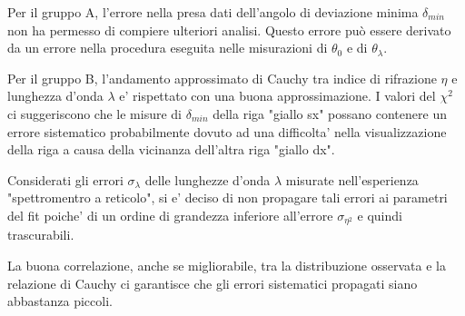 Per il gruppo A, l'errore nella presa dati dell'angolo di deviazione minima $\delta_{min}$ non ha permesso di compiere ulteriori analisi.
Questo errore può essere derivato da un errore nella procedura eseguita nelle misurazioni di $\theta_0$ e di $\theta_{\lambda}$.

Per il gruppo B, l'andamento approssimato di Cauchy tra indice di rifrazione $\eta$ e lunghezza d'onda $\lambda$ e' rispettato con una buona approssimazione.
I valori del $\chi^2$ ci suggeriscono che le misure di $\delta_{min}$ della riga "giallo sx" possano contenere un errore sistematico probabilmente dovuto ad una difficolta' nella visualizzazione della riga a causa della vicinanza dell'altra riga "giallo dx".

Considerati gli errori $\sigma_{\lambda}$ delle lunghezze d'onda $\lambda$ misurate nell'esperienza "spettromentro a reticolo", si e' deciso di non propagare tali errori ai parametri del fit poiche' di un ordine di grandezza inferiore all'errore $\sigma_{\eta^2}$ e quindi trascurabili.

La buona correlazione, anche se migliorabile, tra la distribuzione osservata e la relazione di Cauchy ci garantisce che gli errori sistematici propagati siano abbastanza piccoli.